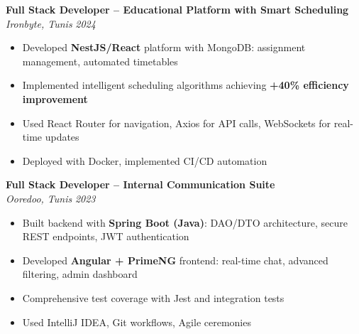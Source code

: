 \documentclass[10pt,a4paper]{article}
\begin{document}
{\vspace{3pt}
\textbf{Full Stack Developer -- Educational Platform with Smart Scheduling}\\[1pt]
\textit{Ironbyte, Tunis} \hfill \textit{2024}
\begin{itemize}[leftmargin=12pt,itemsep=2pt,topsep=3pt,parsep=0pt]
  \item Developed \textbf{NestJS/React} platform with MongoDB: assignment management, automated timetables
  \item Implemented intelligent scheduling algorithms achieving \textbf{+40\% efficiency improvement}
  \item Used React Router for navigation, Axios for API calls, WebSockets for real-time updates
  \item Deployed with Docker, implemented CI/CD automation
\end{itemize}

\vspace{3pt}
\textbf{Full Stack Developer -- Internal Communication Suite}\\[1pt]
\textit{Ooredoo, Tunis} \hfill \textit{2023}
\begin{itemize}[leftmargin=12pt,itemsep=2pt,topsep=3pt,parsep=0pt]
  \item Built backend with \textbf{Spring Boot (Java)}: DAO/DTO architecture, secure REST endpoints, JWT authentication
  \item Developed \textbf{Angular + PrimeNG} frontend: real-time chat, advanced filtering, admin dashboard
  \item Comprehensive test coverage with Jest and integration tests
  \item Used IntelliJ IDEA, Git workflows, Agile ceremonies
\end{itemize}

}

\vspace{4pt}
\end{document}
